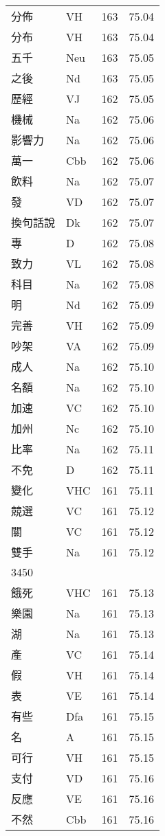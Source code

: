 \documentclass[twocolumn]{book}
\begin{document}
\begin{supertabular}{llrr}
分佈 & VH & 163 &  75.04\\
分布 & VH & 163 &  75.04\\
五千 & Neu & 163 &  75.05\\
之後 & Nd & 163 &  75.05\\
歷經 & VJ & 162 &  75.05\\
機械 & Na & 162 &  75.06\\
影響力 & Na & 162 &  75.06\\
萬一 & Cbb & 162 &  75.06\\
飲料 & Na & 162 &  75.07\\
發 & VD & 162 &  75.07\\
換句話說 & Dk & 162 &  75.07\\
專 & D & 162 &  75.08\\
致力 & VL & 162 &  75.08\\
科目 & Na & 162 &  75.08\\
明 & Nd & 162 &  75.09\\
完善 & VH & 162 &  75.09\\
吵架 & VA & 162 &  75.09\\
成人 & Na & 162 &  75.10\\
名額 & Na & 162 &  75.10\\
加速 & VC & 162 &  75.10\\
加州 & Nc & 162 &  75.10\\
比率 & Na & 162 &  75.11\\
不免 & D & 162 &  75.11\\
變化 & VHC & 161 &  75.11\\
競選 & VC & 161 &  75.12\\
關 & VC & 161 &  75.12\\
雙手 & Na & 161 &  75.12\\
3450\\
餓死 & VHC & 161 &  75.13\\
樂園 & Na & 161 &  75.13\\
湖 & Na & 161 &  75.13\\
產 & VC & 161 &  75.14\\
假 & VH & 161 &  75.14\\
表 & VE & 161 &  75.14\\
有些 & Dfa & 161 &  75.15\\
名 & A & 161 &  75.15\\
可行 & VH & 161 &  75.15\\
支付 & VD & 161 &  75.16\\
反應 & VE & 161 &  75.16\\
不然 & Cbb & 161 &  75.16\\

\end{supertabular}
\end{document}
